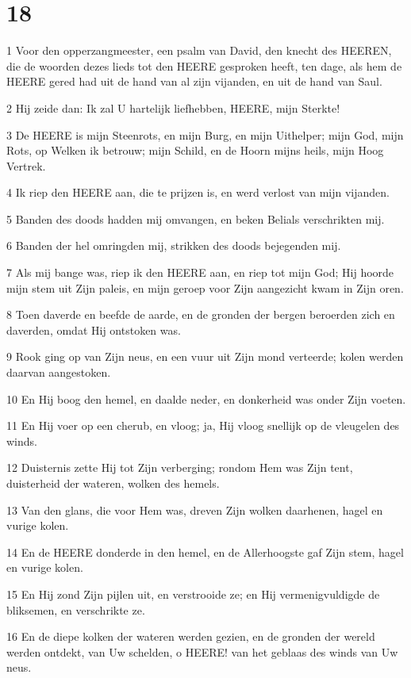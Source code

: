 \chapter{18}

\par 1 Voor den opperzangmeester, een psalm van David, den knecht des HEEREN, die de woorden dezes lieds tot den HEERE gesproken heeft, ten dage, als hem de HEERE gered had uit de hand van al zijn vijanden, en uit de hand van Saul.
\par 2 Hij zeide dan: Ik zal U hartelijk liefhebben, HEERE, mijn Sterkte!
\par 3 De HEERE is mijn Steenrots, en mijn Burg, en mijn Uithelper; mijn God, mijn Rots, op Welken ik betrouw; mijn Schild, en de Hoorn mijns heils, mijn Hoog Vertrek.
\par 4 Ik riep den HEERE aan, die te prijzen is, en werd verlost van mijn vijanden.
\par 5 Banden des doods hadden mij omvangen, en beken Belials verschrikten mij.
\par 6 Banden der hel omringden mij, strikken des doods bejegenden mij.
\par 7 Als mij bange was, riep ik den HEERE aan, en riep tot mijn God; Hij hoorde mijn stem uit Zijn paleis, en mijn geroep voor Zijn aangezicht kwam in Zijn oren.
\par 8 Toen daverde en beefde de aarde, en de gronden der bergen beroerden zich en daverden, omdat Hij ontstoken was.
\par 9 Rook ging op van Zijn neus, en een vuur uit Zijn mond verteerde; kolen werden daarvan aangestoken.
\par 10 En Hij boog den hemel, en daalde neder, en donkerheid was onder Zijn voeten.
\par 11 En Hij voer op een cherub, en vloog; ja, Hij vloog snellijk op de vleugelen des winds.
\par 12 Duisternis zette Hij tot Zijn verberging; rondom Hem was Zijn tent, duisterheid der wateren, wolken des hemels.
\par 13 Van den glans, die voor Hem was, dreven Zijn wolken daarhenen, hagel en vurige kolen.
\par 14 En de HEERE donderde in den hemel, en de Allerhoogste gaf Zijn stem, hagel en vurige kolen.
\par 15 En Hij zond Zijn pijlen uit, en verstrooide ze; en Hij vermenigvuldigde de bliksemen, en verschrikte ze.
\par 16 En de diepe kolken der wateren werden gezien, en de gronden der wereld werden ontdekt, van Uw schelden, o HEERE! van het geblaas des winds van Uw neus.
